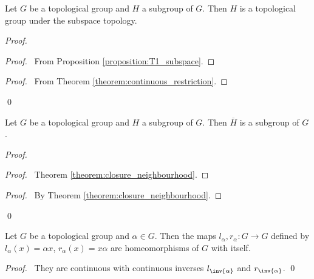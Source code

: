 \begin{lemma}
    Let $G$ be a topological group and $H$ a subgroup of $G$. Then $H$ is a topological group
    under the subspace topology.
\end{lemma}

\begin{proof}
    \pf
    \begin{proof}
        \pf\ From Proposition \ref{proposition:T1_subspace}.
    \end{proof}
    \begin{proof}
        \pf\ From Theorem \ref{theorem:continuous_restriction}.
    \end{proof}
    \qed
\end{proof}

\begin{lemma}
    Let $G$ be a topological group and $H$ a subgroup of $G$. Then 
    $\overline{H}$ is a subgroup of $G$.
\end{lemma}

\begin{proof}
    \pf
    \begin{proof}
        \pf\ Theorem \ref{theorem:closure_neighbourhood}.
    \end{proof}
    \qedstep
    \begin{proof}
        \pf\ By Theorem \ref{theorem:closure_neighbourhood}.
    \end{proof}
    \qed
\end{proof}

\begin{proposition}
    \label{proposition:translation_homeomorphism}
    Let $G$ be a topological group and $\alpha \in G$. Then the maps
    $l_\alpha, r_\alpha : G \rightarrow G$ defined by $l_\alpha(x) = \alpha x$,
    $r_\alpha(x) = x\alpha$ are homeomorphisms of $G$ with itself.
\end{proposition}

\begin{proof}
    \pf\ They are continuous with continuous inverses $l_{\inv{\alpha}}$ and
    $r_{\inv{\alpha}}$. \qed
\end{proof}

